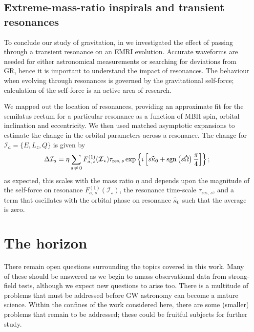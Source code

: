 \subsection{Extreme-mass-ratio inspirals and transient resonances}\label{sec:Review-resonances}

To conclude our study of gravitation, in  we investigated the effect of passing through a transient resonance on an EMRI evolution. Accurate waveforms are needed for either astronomical measurements or searching for deviations from GR, hence it is important to understand the impact of resonances. The behaviour when evolving through resonances is governed by the gravitational self-force; calculation of the self-force is an active area of research.

We mapped out the location of resonances, providing an approximate fit for the semilatus rectum for a particular resonance as a function of MBH spin, orbital inclination and eccentricity. We then used matched asymptotic expansions to estimate the change in the orbital parameters across a resonance. The change for $\mathcal{I}_a = \{E,L_z,Q\}$ is given by
\begin{equation}
\Delta \mathcal{I}_a = \eta\sum_{s\,\neq\,0}F_{a,\,s}^{(1)}(\boldsymbol{\mathcal{I}}_\star)\tau_{\mathrm{res},\,s}\exp\left\{i\left[s \widehat{\kappa}_0 +\operatorname{sgn}\left(s\dot{\Omega}\right)\dfrac{\pi}{4}\right]\right\};
\end{equation}
as expected, this scales with the mass ratio $\eta$ and depends upon the magnitude of the self-force on resonance $F_{a,\,s}^{(1)}(\boldsymbol{\mathcal{I}}_\star)$, the resonance time-scale $\tau_{\mathrm{res},\,s}$, and a term that oscillates with the orbital phase on resonance $\widehat{\kappa}_0$ such that the average is zero.

\section{The horizon}

There remain open questions surrounding the topics covered in this work. Many of these should be answered as we begin to amass observational data from strong-field tests, although we expect new questions to arise too. There is a multitude of problems that must be addressed before GW astronomy can become a mature science. Within the confines of the work considered here, there are some (smaller) problems that remain to be addressed; these could be fruitful subjects for further study.

